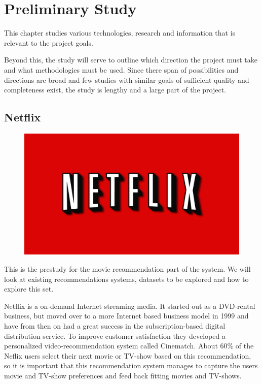 
\chapter{Preliminary Study}

\minitoc
\noindent
This chapter studies various technologies, research and information that is relevant to the project goals.

Beyond this, the study will serve to outline which direction the project must take and what methodologies must be used. Since there span of possibilities and directions are broad and few studies with similar goals of sufficient quality and completeness exist, the study is lengthy and a large part of the project.

\clearpage



\section{Netflix}

\begin{figure}
\vspace{-30pt}
\centering
\includegraphics[width = .25\textwidth]{image/netflix-logo.png}
\end{figure}
This is the prestudy for the movie recommendation part of the system. We will look at existing recommendations systems, datasets to be explored and how to explore this set.

Netflix is a on-demand Internet streaming media. It started out as a DVD-rental business, but moved over to a more Internet based business model in 1999 and have from then on had a great success in the subscription-based digital distribution service. To improve customer satisfaction they developed a personalized video-recommendation system called Cinematch. About 60\% of the Neflix users select their next movie or TV-show based on this recommendation\cite{hownetflixworks}, so it is important that this recommendation system manages to capture the users movie and TV-show preferences and feed back fitting movies and TV-shows.

